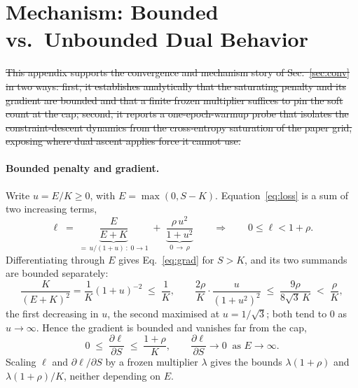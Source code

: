\documentclass[10pt]{article}
\newcommand{\del}[1]{{\color{red}\sout{#1}}}
\begin{document}



\appendix

\section{Mechanism: Bounded vs.\ Unbounded Dual Behavior}
\label{app:mech}

\del{This appendix supports the convergence and mechanism story of
Sec.~\ref{sec:conv} in two ways: first, it establishes analytically that
the saturating penalty and its gradient are bounded and that a finite
frozen multiplier suffices to pin the soft count at the cap; second, it
reports a one-epoch-warmup probe that isolates the constraint-descent
dynamics from the cross-entropy saturation of the paper grid, exposing
where dual ascent applies force it cannot use.}

{\color{blue}
\paragraph{Bounded penalty and gradient.}
Write $u=E/K\ge 0$, with $E=\max(0,S-K)$. Equation~\eqref{eq:loss} is a sum of two
increasing terms,
\[
\ell \;=\;
\underbrace{\frac{E}{E+K}}_{=\,u/(1+u)\,:\;0\to 1}
\;+\;
\underbrace{\frac{\rho\,u^{2}}{1+u^{2}}}_{0\,\to\,\rho}
\qquad\Longrightarrow\qquad
0\le\ell<1+\rho .
\]
Differentiating through $E$ gives Eq.~\eqref{eq:grad} for $S>K$, and its two summands are
bounded separately:
\[
\frac{K}{(E+K)^{2}}=\frac{1}{K}(1+u)^{-2}\;\le\;\frac{1}{K},
\qquad
\frac{2\rho}{K}\cdot\frac{u}{(1+u^{2})^{2}}\;\le\;\frac{9\rho}{8\sqrt3\,K}\;<\;\frac{\rho}{K},
\]
the first decreasing in $u$, the second maximised at $u=1/\sqrt3$; both tend to $0$ as
$u\to\infty$. Hence the gradient is bounded and vanishes far from the cap,
\[
0\;\le\;\frac{\partial\ell}{\partial S}\;\le\;\frac{1+\rho}{K},
\qquad
\frac{\partial\ell}{\partial S}\to 0 \ \text{ as } E\to\infty .
\]
Scaling $\ell$ and $\partial\ell/\partial S$ by a frozen multiplier $\lambda$ gives the
bounds $\lambda(1+\rho)$ and $\lambda(1+\rho)/K$, neither depending on $E$.
}
\end{document}
